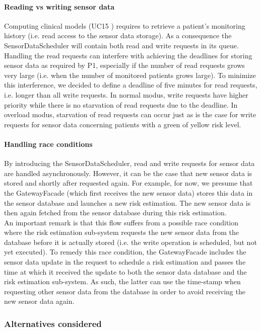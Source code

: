 \documentclass[a4paper,10pt]{article}
\begin{document}
\paragraph{Reading vs writing sensor data}
Computing clinical models (UC15 ) requires to retrieve a patient’s monitoring history (i.e. read access to the sensor data storage). As a consequence the SensorDataScheduler will contain both read and write requests in its queue. Handling the read requests can interfere with achieving the deadlines for storing sensor data as required by P1, especially if the number of read requests grows very large (i.e. when the number of monitored patients grows large). To minimize this interference, we decided to define a deadline of five minutes for read requests, i.e. longer than all write requests. In normal modus, write requests have higher priority while there is no starvation of read requests due to the deadline. In overload modus, starvation of read requests can occur just as is the case for write requests for sensor data concerning patients with a green of yellow risk level.

\paragraph{Handling race conditions} By introducing the SensorDataScheduler, read and write requests for sensor data are handled asynchronously. However, it can be the case that new sensor data is stored and shortly after requested again. For example, for now, we presume that the GatewayFacade (which first receives the new sensor data) stores this data in the sensor database and launches a new risk estimation. The new sensor data is then again fetched from the sensor database during this risk estimation.
\\

An important remark is that this flow suffers from a possible race condition where the risk estimation sub-system requests the new sensor data from the database before it is actually stored (i.e. the write operation is scheduled, but not yet executed). To remedy this race condition, the GatewayFacade includes the sensor data update in the request to schedule a risk estimation and passes the time at which it received the update to both the sensor data database and the risk estimation sub-system. As such, the latter can use the time-stamp when requesting other sensor data from the database in order to avoid receiving the new sensor data again.

\subsubsection*{Alternatives considered}
\end{document}
